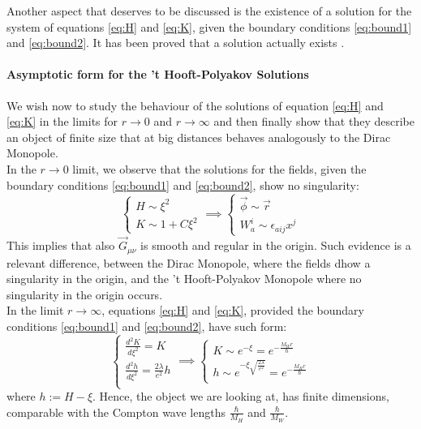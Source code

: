 Another aspect that deserves to be discussed is the existence of a solution for the system of equations \ref{eq:H} and \ref{eq:K}, given the boundary conditions \ref{eq:bound1} and \ref{eq:bound2}. It has been proved that a solution actually exists \cite{Taubes:Sol}.

\paragraph{Asymptotic form for the 't Hooft-Polyakov Solutions} 
We wish now to study the behaviour of the solutions of equation \ref{eq:H} and \ref{eq:K} in the limits for $r \to 0$ and $r \to \infty$ and then finally show that they describe an object of finite size that at big distances behaves analogously to the Dirac Monopole.\\

In the $r \to 0$ limit, we observe that the solutions for the fields, given the boundary conditions \ref{eq:bound1} and \ref{eq:bound2}, show no singularity: 
\begin{equation}
  \begin{cases}  
  H \sim \xi^2\\
  K \sim 1 + C \xi^2 
  \end{cases}
  \implies
  \begin{cases}
  \vec{\phi} \sim \vec{r}\\
  W^{i}_{a} \sim \epsilon_{aij}x^j
  
  \end{cases}
\end{equation}
This implies that also   $\vec{G}_{\mu \nu}$ is smooth and regular in the origin. Such evidence is a relevant difference, between the Dirac Monopole, where the fields dhow a singularity in the origin, and the 't Hooft-Polyakov Monopole where no singularity in the origin occurs. \\

In the limit $r \to \infty$, equations \ref{eq:H} and \ref{eq:K}, provided the boundary conditions \ref{eq:bound1} and \ref{eq:bound2}, have such form: 
\begin{equation}
\begin{cases}
\frac{d^2 K}{d \xi^2}    = K    \\
\frac{d^2 h}{d \xi^2}   =  \frac{2 \lambda}{e^2} h \\
\end{cases}
\implies
\begin{cases}
K \sim e^{-\xi} = e^{- \frac{M_W r}{\hbar}}\\
h \sim e^{-\xi \sqrt{\frac{2 \lambda}{e^2}}} = e^{- \frac{M_H r}{\hbar}} \\
\end{cases}
\end{equation}
where $h:= H - \xi$.
Hence, the object we are looking at, has finite dimensions, comparable with the Compton wave lengths $\frac{\hbar}{M_H}$ and $\frac{\hbar}{M_W}$. \\

